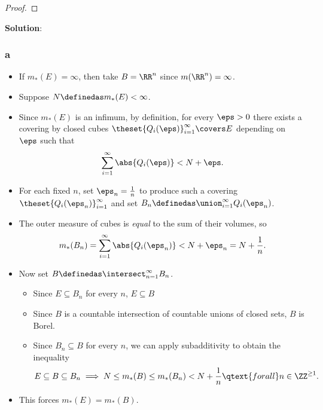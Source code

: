 \begin{solution}
\begin{proof}
\end{proof}

\textbf{Solution}:

\hypertarget{a-4}{%
\subsubsection{a}\label{a-4}}

\begin{itemize}
\item
  If \(m_*(E) = \infty\), then take \(B = \RR^n\) since
  \(m(\RR^n) = \infty\).
\item
  Suppose \(N \definedas m_*(E) < \infty\).
\item
  Since \(m_*(E)\) is an infimum, by definition, for every \(\eps> 0\)
  there exists a covering by closed cubes
  \(\theset{Q_i(\eps)}_{i=1}^\infty \covers E\) depending on \(\eps\)
  such that
  \begin{align*}
  \sum_{i=1}^\infty \abs{Q_i(\eps)} < N + \eps
  .\end{align*}
\item
  For each fixed \(n\), set \(\eps_n = {1\over n}\) to produce such a
  covering \(\theset{Q_i(\eps_n)}_{i=1}^\infty\) and set
  \(B_n \definedas \union_{i=1}^\infty Q_i(\eps_n)\).
\item
  The outer measure of cubes is \emph{equal} to the sum of their
  volumes, so
  \begin{align*}
  m_*(B_n) = \sum_{i=1}^\infty \abs{Q_i(\eps_n)} < N + \eps_n = N + {1\over n}
  .\end{align*}
\item
  Now set \(B \definedas \intersect_{n=1}^\infty B_n\).

  \begin{itemize}
  \tightlist
  \item
    Since \(E\subseteq B_n\) for every \(n\), \(E\subseteq B\)
  \item
    Since \(B\) is a countable intersection of countable unions of
    closed sets, \(B\) is Borel.
  \item
    Since \(B_n \subseteq B\) for every \(n\), we can apply
    subadditivity to obtain the inequality
    \begin{align*}
    E \subseteq B \subseteq B_n \implies
    N \leq m_*(B) \leq m_*(B_n) < N + {1\over n} \qtext{for all} n\in \ZZ^{\geq 1}
    .\end{align*}
  \end{itemize}
\item
  This forces \(m_*(E) = m_*(B)\).
\end{itemize}


\end{solution}
